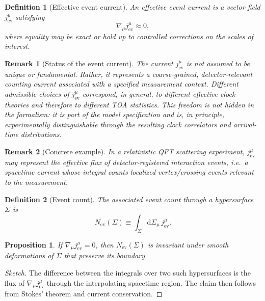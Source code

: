 \documentclass[pdflatex,sn-mathphys-num]{sn-jnl}
\theoremstyle{thmstylethree}
\newtheorem{definition}{Definition}[section]
\theoremstyle{thmstyleone}
\newtheorem{proposition}{Proposition}[section]
\theoremstyle{thmstyletwo}
\newtheorem{remark}{Remark}[section]
\numberwithin{equation}{section}
\newcommand{\dd}{\mathrm{d}}
\newcommand{\Sig}{\Sigma}
\newcommand{\Jev}{j^\mu_{\mathrm{ev}}}
\newcommand{\Nev}{N_{\mathrm{ev}}}
\begin{document}
    \begin{definition}[Effective event current]
An \emph{effective event current} is a vector field $\Jev$ satisfying
\begin{equation}
    \nabla_\mu \Jev \approx 0 ,
\end{equation}
where equality may be exact or hold up to controlled corrections on the scales of interest.
    \end{definition}
    
    \begin{remark}[Status of the event current]
The current $j^\mu_{\mathrm{ev}}$ is not assumed to be unique or fundamental. Rather, it represents a coarse-grained, detector-relevant counting current associated with a specified measurement context. Different admissible choices of $j^\mu_{\mathrm{ev}}$ correspond, in general, to different effective clock theories and therefore to different TOA statistics. This freedom is not hidden in the formalism: it is part of the model specification and is, in principle, experimentally distinguishable through the resulting clock correlators and arrival-time distributions.
    \end{remark}
    
    \begin{remark}[Concrete example]
In a relativistic QFT scattering experiment, $j^\mu_{\mathrm{ev}}$ may represent the effective flux of detector-registered interaction events, i.e.\ a spacetime current whose integral counts localized vertex/crossing events relevant to the measurement.
    \end{remark}
    
    \begin{definition}[Event count]
The associated event count through a hypersurface $\Sig$ is
\begin{equation}
    \Nev(\Sig) \equiv \int_\Sig \dd\Sigma_\mu\,\Jev .
\end{equation}
    \end{definition}
    
    \begin{proposition}
        If $\nabla_\mu \Jev = 0$, then $\Nev(\Sig)$ is invariant under smooth deformations of $\Sig$ that preserve its boundary.
    \end{proposition}
    
    \begin{proof}[Sketch]
The difference between the integrals over two such hypersurfaces is the flux of $\nabla_\mu j^\mu_{\mathrm{ev}}$ through the interpolating spacetime region. The claim then follows from Stokes' theorem and current conservation.
    \end{proof}
    
\end{document}

